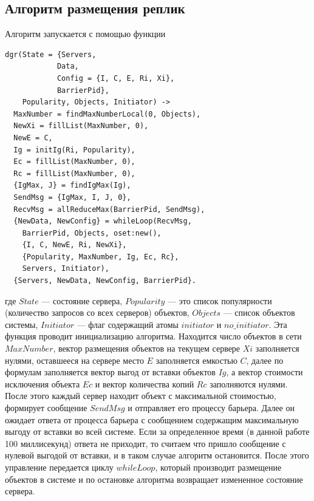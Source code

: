 		\subsection{Алгоритм размещения реплик}
			Алгоритм запускается с помощью функции 
			\begin{lstlisting}
dgr(State = {Servers,
            Data, 
            Config = {I, C, E, Ri, Xi}, 
            BarrierPid}, 
    Popularity, Objects, Initiator) ->
  MaxNumber = findMaxNumberLocal(0, Objects),
  NewXi = fillList(MaxNumber, 0),
  NewE = C,
  Ig = initIg(Ri, Popularity),
  Ec = fillList(MaxNumber, 0),
  Rc = fillList(MaxNumber, 0),
  {IgMax, J} = findIgMax(Ig),
  SendMsg = {IgMax, I, J, 0},
  RecvMsg = allReduceMax(BarrierPid, SendMsg),
  {NewData, NewConfig} = whileLoop(RecvMsg, 
    BarrierPid, Objects, oset:new(),
    {I, C, NewE, Ri, NewXi}, 
    {Popularity, MaxNumber, Ig, Ec, Rc}, 
    Servers, Initiator),
  {Servers, NewData, NewConfig, BarrierPid}.
			\end{lstlisting}
			где $State$ --- состояние сервера, $Popularity$ --- это список популярности (количество запросов со всех серверов) объектов, $Objects$ --- список объектов системы, $Initiator$
			--- флаг содержащий атомы $initiator$ и $no\_initiator$. Эта функция проводит инициализацию алгоритма. Находится число объектов в сети $MaxNumber$, вектор размещения объектов на
			текущем сервере $Xi$ заполняется нулями, оставшееся на сервере место $E$ заполняется емкостью $C$, далее по формулам заполняется вектор выгод от вставки объектов $Ig$, а вектор
			стоимости исключения объекта $Ec$ и вектор количества копий $Rc$ заполняются нулями. После этого каждый сервер находит объект с максимальной стоимостью, формирует сообщение $SendMsg$ и отправляет 
			его процессу барьера. Далее он ожидает ответа от процесса барьера с сообщением содержащим максимальную выгоду от вставки во всей системе. Если за определенное время (в данной
			работе 100 миллисекунд) ответа не приходит, то считаем что пришло сообщение с нулевой выгодой от вставки, и в таком случае алгоритм остановится. После этого управление передается 
			циклу $whileLoop$, который производит размещение объектов в системе и по остановке алгоритма возвращает измененное состояние сервера. 

